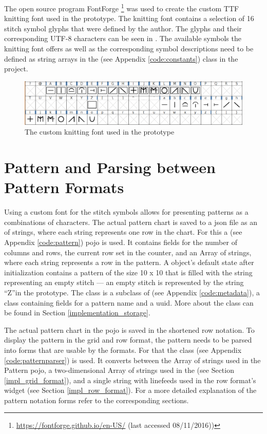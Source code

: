 The open source program FontForge \footnote{\url{https://fontforge.github.io/en-US/} (last accessed 08/11/2016))} was used to create the custom \gls{TTF} knitting font used in the prototype. The knitting font contains a selection of 16 stitch symbol glyphs that were defined by the author. The glyphs and their corresponding UTF-8 characters can be seen in . The available symbols the knitting font offers as well as the corresponding symbol descriptions need to be defined as string arrays in the (see Appendix \ref{code:constants}) class in the project.

\begin{figure}[H]
  \centering
  \includegraphics[width=.7\textwidth]{images/OwnKnittingFont_Chart.png}
  \caption[The custom knitting font used in the prototype \protect{}]{The custom knitting font used in the prototype} 
  \label{fig:own_knitting_font} 
\end{figure}

\section{Pattern and Parsing between Pattern Formats}
Using a custom font for the stitch symbols allows for presenting patterns as a combinations of characters. The actual pattern chart is saved to a \gls{json} file as an  of strings, where each string represents one row in the chart. For this a  (see Appendix \ref{code:pattern}) \gls{pojo} is used. It contains fields for the number of columns and rows, the current row set in the counter, and an Array of strings, where each string represents a row in the pattern. A  object’s default state after initialization contains a pattern of the size 10 x 10 that is filled with the string representing an empty stitch --- an empty stitch is represented by the string ``Z''in the prototype. The class  is a subclass of  (see Appendix \ref{code:metadata}), a class containing fields for a pattern name and a \gls{uuid}. More about the  class can be found in Section \ref{implementation_storage}.

The actual pattern chart in the  \gls{pojo} is saved in the shortened row notation. To display the pattern in the grid and row format, the pattern needs to be parsed into forms that are usable by the formats. For that the class  (see Appendix \ref{code:patternparser}) is used. It converts between the Array of strings used in the Pattern \gls{pojo}, a two-dimensional Array of strings used in the  (see Section \ref{impl_grid_format}), and a single string with linefeeds used in the row format's  widget (see Section \ref{impl_row_format}). For a more detailed explanation of the pattern notation forms refer to the corresponding sections.

